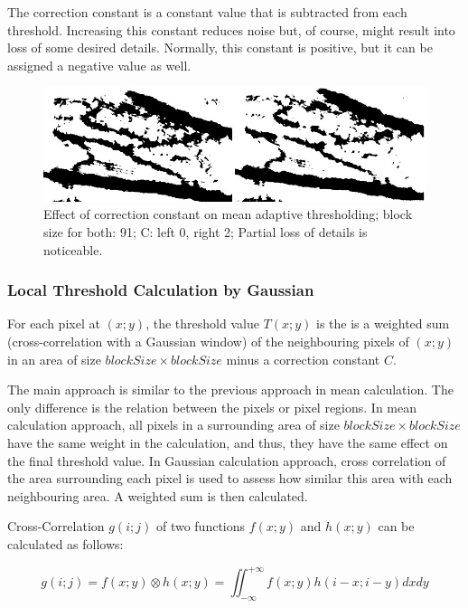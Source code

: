 The correction constant is a constant value that is subtracted from each threshold. Increasing this constant reduces noise but, of course, might result into loss of some desired details. Normally, this constant is positive, but it can be assigned a negative value as well.

\begin{figure}[H]
\centering
\includegraphics[scale=0.8]{figures/compare2.JPG}


\caption[Effect of correction constant on mean adaptive thresholding]{Effect of correction constant on mean adaptive thresholding; block size for both: 91; C: left 0, right 2; Partial loss of details is noticeable.}\label{fig:compare2}
\end{figure}

\subsubsection{Local Threshold Calculation by Gaussian}
For each pixel at $(x; y)$, the threshold value $T(x; y)$ is the is a weighted sum (cross-correlation with a Gaussian window) of the neighbouring pixels of $(x; y)$ in an area of size $blockSize \times blockSize$ minus a correction constant $C$. 

The main approach is similar to the previous approach in mean calculation. The only difference is the relation between the pixels or pixel regions. In mean calculation approach, all pixels in a surrounding area of size $blockSize \times blockSize$ have the same weight in the calculation, and thus, they have the same effect on the final threshold value. In Gaussian calculation approach, cross correlation of the area surrounding each pixel is used to assess how similar this area with each neighbouring area. A weighted sum is then calculated.

Cross-Correlation $g(i ;j)$ of two functions $f(x ;y)$ and $ h(x; y)$ can be calculated as follows:

\begin{equation}
g(i;j) = f(x; y) \otimes h(x; y) = \iint_{-\infty}^{+\infty} f(x; y) h(i - x; i - y) dx dy
\end{equation}
 
